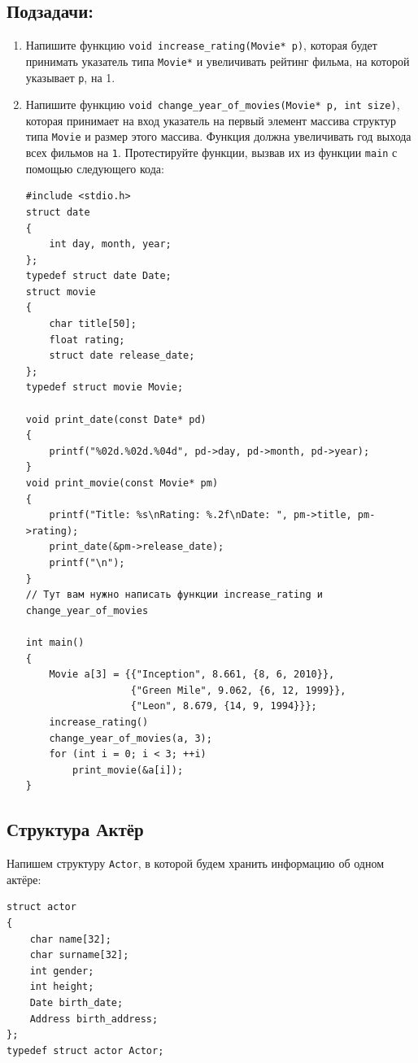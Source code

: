 \documentclass{article}
\begin{document}
\subsection*{Подзадачи:}
\begin{enumerate}

\item Напишите функцию \texttt{void increase\_rating(Movie* p)}, которая будет принимать указатель типа \texttt{Movie*} и увеличивать рейтинг фильма, на которой указывает \texttt{p}, на 1.

\item Напишите функцию \texttt{void change\_year\_of\_movies(Movie* p, int size)}, которая принимает на вход указатель на первый элемент массива структур типа \texttt{Movie} и размер этого массива. Функция должна увеличивать год выхода всех фильмов на \texttt{1}. Протестируйте функции, вызвав их из функции \texttt{main} с помощью следующего кода:

\begin{lstlisting}
#include <stdio.h>
struct date 
{
    int day, month, year;
};
typedef struct date Date;
struct movie 
{
    char title[50];
    float rating;
    struct date release_date;
};
typedef struct movie Movie;

void print_date(const Date* pd) 
{
    printf("%02d.%02d.%04d", pd->day, pd->month, pd->year);
}
void print_movie(const Movie* pm) 
{
    printf("Title: %s\nRating: %.2f\nDate: ", pm->title, pm->rating);
    print_date(&pm->release_date);
    printf("\n");
}
// Тут вам нужно написать функции increase_rating и change_year_of_movies

int main() 
{
    Movie a[3] = {{"Inception", 8.661, {8, 6, 2010}}, 
                  {"Green Mile", 9.062, {6, 12, 1999}}, 
                  {"Leon", 8.679, {14, 9, 1994}}};
    increase_rating()
    change_year_of_movies(a, 3);
    for (int i = 0; i < 3; ++i)
        print_movie(&a[i]);
}
\end{lstlisting}

\end{enumerate}

\newpage
\subsection{Структура Актёр}
Напишем структуру \texttt{Actor}, в которой будем хранить информацию об одном актёре:
\begin{lstlisting}
struct actor 
{
    char name[32];
    char surname[32];
    int gender;
    int height;
    Date birth_date;
    Address birth_address;
};
typedef struct actor Actor;
\end{lstlisting}
\end{document}

